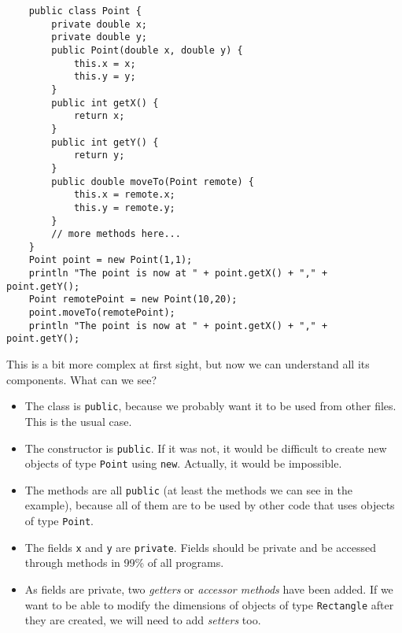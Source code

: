 \begin{verbatim}
    public class Point {
        private double x;
        private double y;
        public Point(double x, double y) {
            this.x = x;
            this.y = y;
        }
        public int getX() {
            return x;
        }
        public int getY() {
            return y;
        }
        public double moveTo(Point remote) {
            this.x = remote.x;
            this.y = remote.y;
        }
        // more methods here...
    }
    Point point = new Point(1,1);
    println "The point is now at " + point.getX() + "," + point.getY();
    Point remotePoint = new Point(10,20);
    point.moveTo(remotePoint);
    println "The point is now at " + point.getX() + "," + point.getY();
\end{verbatim}

This is a bit more complex at first sight, but now we can understand
all its components. What can we see?

\begin{itemize}
\item The class is \verb+public+, because we probably want it to be
  used from other files. This is the usual case.
\item The constructor is \verb+public+. If it was not, it would be
  difficult to create new objects of type \verb+Point+ using
  \verb+new+. Actually, it would be impossible.
\item The methods are all \verb+public+ (at least the methods we can
  see in the example), because all of them are to be used by other
  code that uses objects of type \verb+Point+.
\item The fields \verb+x+ and \verb+y+ are \verb+private+. Fields
  should be private and be accessed through methods in 99\% of all
  programs.
\item As fields are private, two \emph{getters} or \emph{accessor
    methods} have been added. If we want to be able to modify the
  dimensions of objects of type \verb+Rectangle+ after they are
  created, we will need to add \emph{setters} too. 
\end{itemize}

